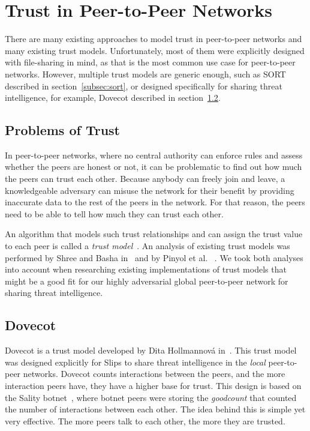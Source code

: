 \section{Trust in Peer-to-Peer Networks}
\label{sec:trust-in-p2p}

There are many existing approaches to model trust in peer-to-peer networks and many existing trust models.
Unfortunately, most of them were explicitly designed with file-sharing in mind, as that is the most common use case for peer-to-peer networks.
However, multiple trust models are generic enough, such as SORT described in section~\ref{subsec:sort}, or designed specifically for sharing threat intelligence, for example, Dovecot described in section~\ref{subsec:dovecot}.

\subsection{Problems of Trust}
\label{subsec:problems-of-trust}
In peer-to-peer networks, where no central authority can enforce rules and assess whether the peers are honest or not, it can be problematic to find out how much the peers can trust each other.
Because anybody can freely join and leave, a knowledgeable adversary can misuse the network for their benefit by providing inaccurate data to the rest of the peers in the network.
For that reason, the peers need to be able to tell how much they can trust each other. 

An algorithm that models such trust relationships and can assign the trust value to each peer is called a \textit{trust model}~\cite{wang2003trust}.
An analysis of existing trust models was performed by Shree and Basha in~\cite{shree2014exhaustive} and by Pinyol et al. ~\cite{pinyol2013computational}. 
We took both analyses into account when researching existing implementations of trust models that might be a good fit for our highly adversarial global peer-to-peer network for sharing threat intelligence.

\subsection{Dovecot}
\label{subsec:dovecot}
Dovecot is a trust model developed by Dita Hollmannová in~\cite{dita}.
This trust model was designed explicitly for Slips to share threat intelligence in the \textit{local} peer-to-peer networks.
Dovecot counts interactions between the peers, and the more interaction peers have, they have a higher base for trust.
This design is based on the Sality botnet~\cite{falliere2011sality}, where botnet peers were storing the \textit{goodcount} that counted the number of interactions between each other.
The idea behind this is simple yet very effective. The more peers talk to each other, the more they are trusted.

